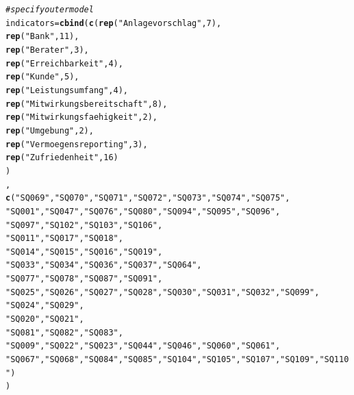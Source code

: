 \documentclass{article}\usepackage[]{graphicx}\usepackage[]{color}
\makeatletter
\newcommand{\hlnum}[1]{\textcolor[rgb]{0.686,0.059,0.569}{#1}}%
\newcommand{\hlstr}[1]{\textcolor[rgb]{0.192,0.494,0.8}{#1}}%
\newcommand{\hlcom}[1]{\textcolor[rgb]{0.678,0.584,0.686}{\textit{#1}}}%
\newcommand{\hlstd}[1]{\textcolor[rgb]{0.345,0.345,0.345}{#1}}%
\newcommand{\hlkwb}[1]{\textcolor[rgb]{0.69,0.353,0.396}{#1}}%
\newcommand{\hlkwd}[1]{\textcolor[rgb]{0.737,0.353,0.396}{\textbf{#1}}}%
\newenvironment{kframe}{%
 \def\at@end@of@kframe{}%
 \ifinner\ifhmode%
  \def\at@end@of@kframe{\end{minipage}}%
  \begin{minipage}{\columnwidth}%
 \fi\fi%
 \def\FrameCommand##1{\hskip\@totalleftmargin \hskip-\fboxsep
 \colorbox{shadecolor}{##1}\hskip-\fboxsep
     \hskip-\linewidth \hskip-\@totalleftmargin \hskip\columnwidth}%
 \MakeFramed {\advance\hsize-\width
   \@totalleftmargin\z@ \linewidth\hsize
   \@setminipage}}%
 {\par\unskip\endMakeFramed%
 \at@end@of@kframe}
\newenvironment{knitrout}{}{} %
\makeatother
\begin{document}
\begin{knitrout}
\begin{kframe}
\begin{alltt}
\hlcom{#specify outer model}
\hlstd{indicators} \hlkwb{=} \hlkwd{cbind}\hlstd{(}\hlkwd{c}\hlstd{(}\hlkwd{rep}\hlstd{(}\hlstr{"Anlagevorschlag"}\hlstd{,}\hlnum{7}\hlstd{),}
                     \hlkwd{rep}\hlstd{(}\hlstr{"Bank"}\hlstd{,}\hlnum{11}\hlstd{),}
                     \hlkwd{rep}\hlstd{(}\hlstr{"Berater"}\hlstd{,}\hlnum{3}\hlstd{),}
                     \hlkwd{rep}\hlstd{(}\hlstr{"Erreichbarkeit"}\hlstd{,}\hlnum{4}\hlstd{),}
                     \hlkwd{rep}\hlstd{(}\hlstr{"Kunde"}\hlstd{,}\hlnum{5}\hlstd{),}
                     \hlkwd{rep}\hlstd{(}\hlstr{"Leistungsumfang"}\hlstd{,}\hlnum{4}\hlstd{),}
                     \hlkwd{rep}\hlstd{(}\hlstr{"Mitwirkungsbereitschaft"}\hlstd{,}\hlnum{8}\hlstd{),}
                     \hlkwd{rep}\hlstd{(}\hlstr{"Mitwirkungsfaehigkeit"}\hlstd{,}\hlnum{2}\hlstd{),}
                     \hlkwd{rep}\hlstd{(}\hlstr{"Umgebung"}\hlstd{,}\hlnum{2}\hlstd{),}
                     \hlkwd{rep}\hlstd{(}\hlstr{"Vermoegensreporting"}\hlstd{,}\hlnum{3}\hlstd{),}
                     \hlkwd{rep}\hlstd{(}\hlstr{"Zufriedenheit"}\hlstd{,}\hlnum{16}\hlstd{)}
                     \hlstd{)}
                   \hlstd{,}
                  \hlkwd{c}\hlstd{(}\hlstr{"SQ069"}\hlstd{,}\hlstr{"SQ070"}\hlstd{,}\hlstr{"SQ071"}\hlstd{,}\hlstr{"SQ072"}\hlstd{,}\hlstr{"SQ073"}\hlstd{,}\hlstr{"SQ074"}\hlstd{,}\hlstr{"SQ075"}\hlstd{,}
                    \hlstr{"SQ001"}\hlstd{,}\hlstr{"SQ047"}\hlstd{,}\hlstr{"SQ076"}\hlstd{,}\hlstr{"SQ080"}\hlstd{,}\hlstr{"SQ094"}\hlstd{,}\hlstr{"SQ095"}\hlstd{,}\hlstr{"SQ096"}\hlstd{,}
                    \hlstr{"SQ097"}\hlstd{,}\hlstr{"SQ102"}\hlstd{,}\hlstr{"SQ103"}\hlstd{,}\hlstr{"SQ106"}\hlstd{,}
                    \hlstr{"SQ011"}\hlstd{,}\hlstr{"SQ017"}\hlstd{,}\hlstr{"SQ018"}\hlstd{,}
                    \hlstr{"SQ014"}\hlstd{,}\hlstr{"SQ015"}\hlstd{,}\hlstr{"SQ016"}\hlstd{,}\hlstr{"SQ019"}\hlstd{,}
                    \hlstr{"SQ033"}\hlstd{,}\hlstr{"SQ034"}\hlstd{,}\hlstr{"SQ036"}\hlstd{,}\hlstr{"SQ037"}\hlstd{,}\hlstr{"SQ064"}\hlstd{,}
                    \hlstr{"SQ077"}\hlstd{,}\hlstr{"SQ078"}\hlstd{,}\hlstr{"SQ087"}\hlstd{,}\hlstr{"SQ091"}\hlstd{,}
                    \hlstr{"SQ025"}\hlstd{,}\hlstr{"SQ026"}\hlstd{,}\hlstr{"SQ027"}\hlstd{,}\hlstr{"SQ028"}\hlstd{,}\hlstr{"SQ030"}\hlstd{,}\hlstr{"SQ031"}\hlstd{,}\hlstr{"SQ032"}\hlstd{,}\hlstr{"SQ099"}\hlstd{,}
                    \hlstr{"SQ024"}\hlstd{,}\hlstr{"SQ029"}\hlstd{,}
                    \hlstr{"SQ020"}\hlstd{,}\hlstr{"SQ021"}\hlstd{,}
                    \hlstr{"SQ081"}\hlstd{,}\hlstr{"SQ082"}\hlstd{,}\hlstr{"SQ083"}\hlstd{,}
                    \hlstr{"SQ009"}\hlstd{,}\hlstr{"SQ022"}\hlstd{,}\hlstr{"SQ023"}\hlstd{,}\hlstr{"SQ044"}\hlstd{,}\hlstr{"SQ046"}\hlstd{,}\hlstr{"SQ060"}\hlstd{,}\hlstr{"SQ061"}\hlstd{,}
                    \hlstr{"SQ067"}\hlstd{,}\hlstr{"SQ068"}\hlstd{,}\hlstr{"SQ084"}\hlstd{,}\hlstr{"SQ085"}\hlstd{,}\hlstr{"SQ104"}\hlstd{,}\hlstr{"SQ105"}\hlstd{,}\hlstr{"SQ107"}\hlstd{,}\hlstr{"SQ109"}\hlstd{,}\hlstr{"SQ110"}\hlstd{)}
                  \hlstd{)}


\end{alltt}
\end{kframe}
\end{knitrout}
\end{document}
